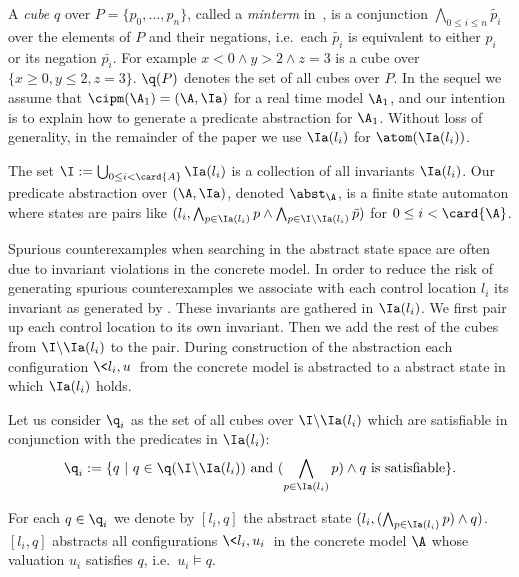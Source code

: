 \documentclass{eptcs}
\begin{document}
A {\em cube} $q$ over $P=\{p_0,...,p_n\}$,
called a {\em minterm} in~\cite{Lahiri06},
is a conjunction 
$\bigwedge_{0\leq i\leq n} \tilde{p_i}$ 
over the elements of $P$ and their negations, 
i.e.\, each $\tilde{p_i}$ is equivalent to either $p_i$ or
its negation $\bar{p_i}$.
For example $x< 0 \land y>2 \land z=3 $ is a cube over
$\{x\geq 0, y\leq 2 , z=3\}$.  $\q(P)$ denotes the set of all cubes over
$P$. In the sequel we assume that $\cipm(\A_1)=(\A,\Ia)$ for a real time model
 $\A_1$, and our intention is to explain how to generate a predicate
 abstraction for $\A_1$. Without loss of generality, in the remainder of the paper 
we use $\Ia(l_i)$ for $\atom(\Ia(l_i))$.  
 
  
\begin{definition}
\label{def.abst}
The set $\I:=\bigcup_{0\leq i< \card{A}} \Ia(l_i)$ is a
collection of all invariants $\Ia(l_i)$. Our predicate abstraction over
$(\A,\Ia)$, denoted $\abst_\A$, is  a finite state automaton where states are
pairs like $(l_i,\bigwedge_{p\in\Ia(l_i)}p\land\bigwedge_{p\in\I\backslash
\Ia(l_i)} \tilde{p})$ for $0\leq i< \card{\A}$. 
\end{definition}

Spurious counterexamples when searching in the abstract state space are often due 
to invariant violations in the concrete model.
In order to reduce the risk of generating spurious counterexamples 
we associate with each control location $l_i$ its invariant
as generated by \cipm . 
These invariants are gathered in $\Ia(l_i)$.
We first pair up each control location to its own invariant. Then we
add the rest of the cubes from $\I \backslash \Ia(l_i)$ to the pair. 
During construction of the abstraction each configuration $\<l_i,u\>$ from the concrete
model is abstracted to a abstract state in which $\Ia(l_i)$ holds.

Let us consider $\q_i$ as the set of all cubes over $\I \backslash \Ia(l_i)$ which are
satisfiable in conjunction with the predicates in $\Ia(l_i)$: 
\[\q_i:=\{q~|~q \in\q(\I \backslash\Ia(l_i))\text{ and }
(\bigwedge_{p\in\Ia(l_i)}p)\land q~\text{is satisfiable}\}. \] 



\noindent
For each $q\in \q_i$ we denote by $[l_i, q]$ the abstract state 
$(l_i,(\bigwedge_{p\in\Ia(l_i)}p)\land q )$.
$[l_i, q]$ abstracts all configurations $\< l_i,u_i\>$ in the concrete
model $\A$ whose valuation $u_i$ satisfies $q$, i.e.\ $u_i\models
 q$.
\end{document}
